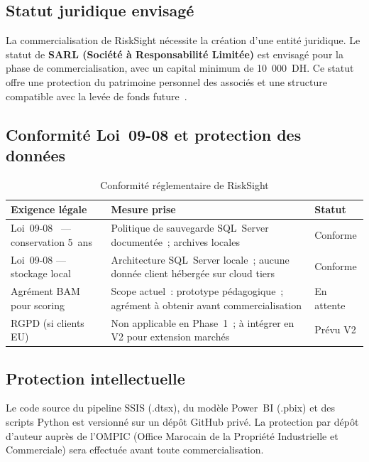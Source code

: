 \documentclass[12pt, a4paper]{report}
\begin{document}
\subsection{Statut juridique envisagé}

La commercialisation de RiskSight nécessite la création d'une entité juridique.
Le statut de \textbf{SARL (Société à Responsabilité Limitée)} est envisagé pour
la phase de commercialisation, avec un capital minimum de 10~000~DH. Ce statut
offre une protection du patrimoine personnel des associés et une structure
compatible avec la levée de fonds future~\cite{guide_pfa}.

\subsection{Conformité Loi~09-08 et protection des données}

\begin{table}[H]
\centering
\caption{Conformité réglementaire de RiskSight}
\label{tab:conformite}
\renewcommand{\arraystretch}{1.4}
\begin{tabularx}{\textwidth}{p{3.5cm} X p{3cm}}
\toprule
\rowcolor{primary!12}
Exigence légale & Mesure prise & Statut \\
\midrule
Loi~09-08~\cite{loi0908} --- conservation 5~ans & Politique de sauvegarde SQL~Server documentée~; archives locales & Conforme \\
Loi~09-08 --- stockage local & Architecture SQL~Server locale~; aucune donnée client hébergée sur cloud tiers & Conforme \\
Agrément BAM pour scoring & Scope actuel~: prototype pédagogique~; agrément à obtenir avant commercialisation & En attente \\
RGPD (si clients EU) & Non applicable en Phase~1~; à intégrer en V2 pour extension marchés & Prévu V2 \\
\bottomrule
\end{tabularx}
\end{table}

\subsection{Protection intellectuelle}

Le code source du pipeline SSIS (.dtsx), du modèle Power~BI (.pbix) et des
scripts Python est versionné sur un dépôt GitHub privé. La protection par
dépôt d'auteur auprès de l'OMPIC (Office Marocain de la Propriété Industrielle
et Commerciale) sera effectuée avant toute commercialisation.
\end{document}
